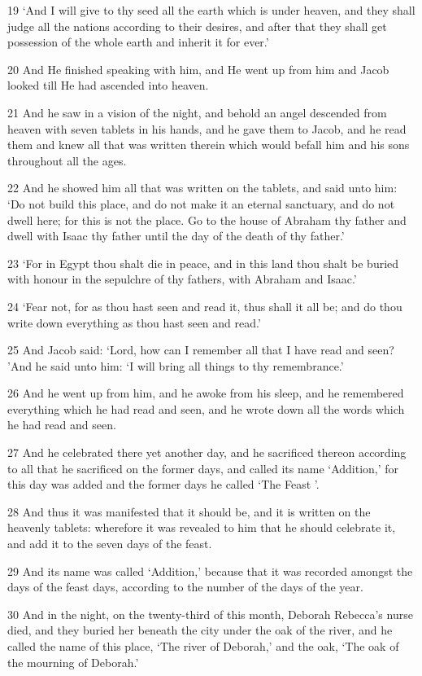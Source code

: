 \par 19 ‘And I will give to thy seed all the earth which is under heaven, and they shall judge all the nations according to their desires, and after that they shall get possession of the whole earth and inherit it for ever.’
\par 20 And He finished speaking with him, and He went up from him and Jacob looked till He had ascended into heaven.
\par 21 And he saw in a vision of the night, and behold an angel descended from heaven with seven tablets in his hands, and he gave them to Jacob, and he read them and knew all that was written therein which would befall him and his sons throughout all the ages.
\par 22 And he showed him all that was written on the tablets, and said unto him: ‘Do not build this place, and do not make it an eternal sanctuary, and do not dwell here; for this is not the place. Go to the house of Abraham thy father and dwell with Isaac thy father until the day of the death of thy father.’
\par 23 ‘For in Egypt thou shalt die in peace, and in this land thou shalt be buried with honour in the sepulchre of thy fathers, with Abraham and Isaac.’
\par 24 ‘Fear not, for as thou hast seen and read it, thus shall it all be; and do thou write down everything as thou hast seen and read.’
\par 25 And Jacob said: ‘Lord, how can I remember all that I have read and seen? ’And he said unto him: ‘I will bring all things to thy remembrance.’
\par 26 And he went up from him, and he awoke from his sleep, and he remembered everything which he had read and seen, and he wrote down all the words which he had read and seen.
\par 27 And he celebrated there yet another day, and he sacrificed thereon according to all that he sacrificed on the former days, and called its name ‘Addition,’ for this day was added and the former days he called ‘The Feast ’.
\par 28 And thus it was manifested that it should be, and it is written on the heavenly tablets: wherefore it was revealed to him that he should celebrate it, and add it to the seven days of the feast.
\par 29 And its name was called ‘Addition,’ because that it was recorded amongst the days of the feast days, according to the number of the days of the year.
\par 30 And in the night, on the twenty-third of this month, Deborah Rebecca's nurse died, and they buried her beneath the city under the oak of the river, and he called the name of this place, ‘The river of Deborah,’ and the oak, ‘The oak of the mourning of Deborah.’
